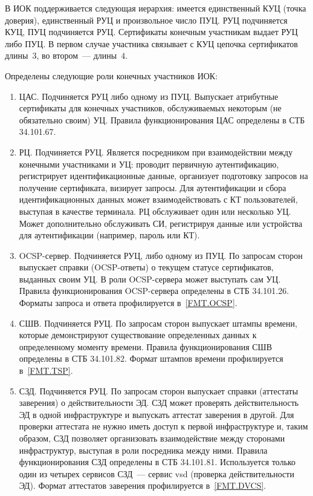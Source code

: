 В ИОК поддерживается следующая иерархия: 
имеется единственный КУЦ (точка доверия), единственный РУЦ и
произвольное число ПУЦ. РУЦ подчиняется КУЦ, ПУЦ подчиняется РУЦ. 
Сертификаты конечным участникам выдает РУЦ либо ПУЦ.
%
В первом случае участника связывает с КУЦ цепочка сертификатов длины~$3$,
во втором~--- длины~$4$.

Определены следующие роли конечных участников ИОК:
\begin{enumerate}
\item
ЦАС. Подчиняется РУЦ либо одному из ПУЦ. 
Выпускает атрибутные сертификаты для 
конечных участников, обслуживаемых некоторым (не обязательно своим) УЦ.
Правила функционирования ЦАС определены в СТБ 34.101.67.

\item
РЦ. Подчиняется РУЦ.
Является посредником при взаимодействии между конечными участниками и УЦ:
проводит первичную аутентификацию, регистрирует идентификационные данные,
организует подготовку запросов на получение сертификата, визирует запросы. 
%
Для аутентификации и сбора идентификационных данных может 
взаимодействовать с КТ пользователей, выступая в качестве терминала. 
%  
РЦ обслуживает один или несколько УЦ. Может дополнительно 
обслуживать СИ, регистрируя данные или устройства для аутентификации 
(например, пароль или КТ). 

\item
OCSP-сервер. Подчиняется РУЦ, либо одному из ПУЦ.
По запросам сторон выпускает справки (OCSP-ответы)
о текущем статусе сертификатов, выданных своим УЦ. 
В роли OCSP-сервера может выступать сам УЦ.
Правила функционирования OCSP-сервера определены в СТБ 34.101.26.
%
Форматы запроса и ответа профилируется в~\ref{FMT.OCSP}.

\item
СШВ. Подчиняется РУЦ.
По запросам сторон выпускает штампы времени, которые демонстрируют 
существование определенных данных к определенному моменту времени. 
Правила функционирования СШВ определены в СТБ 34.101.82.
%
Формат штампов времени профилируется в~\ref{FMT.TSP}.

\item
СЗД. Подчиняется РУЦ.
По запросам сторон выпускает справки (аттестаты заверения)
о действительности ЭД. 
%
СЗД может проверять действительность ЭД в одной инфраструктуре и 
выпускать аттестат заверения в другой. Для проверки аттестата не нужно 
иметь доступ к первой инфраструктуре и, таким образом, СЗД позволяет 
организовать взаимодействие между сторонами инфраструктур, выступая в роли 
посредника между ними. 
%
Правила функционирования СЗД определены в СТБ 34.101.81.
Используется только один из четырех сервисов СЗД~---
сервис vsd (проверка действительности ЭД).
%
Формат аттестатов заверения профилируется в~\ref{FMT.DVCS}.


\end{enumerate}
